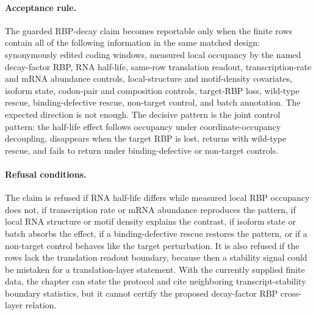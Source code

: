 \paragraph{Acceptance rule.}
The guarded RBP-decay claim becomes reportable only when the finite rows contain all of the following information in the same matched design: synonymously edited coding windows, measured local occupancy by the named decay-factor RBP, RNA half-life, same-row translation readout, transcription-rate and mRNA abundance controls, local-structure and motif-density covariates, isoform state, codon-pair and composition controls, target-RBP loss, wild-type rescue, binding-defective rescue, non-target control, and batch annotation.  The expected direction is not enough.  The decisive pattern is the joint control pattern: the half-life effect follows occupancy under coordinate-occupancy decoupling, disappears when the target RBP is lost, returns with wild-type rescue, and fails to return under binding-defective or non-target controls.

\paragraph{Refusal conditions.}
The claim is refused if RNA half-life differs while measured local RBP occupancy does not, if transcription rate or mRNA abundance reproduces the pattern, if local RNA structure or motif density explains the contrast, if isoform state or batch absorbs the effect, if a binding-defective rescue restores the pattern, or if a non-target control behaves like the target perturbation.  It is also refused if the rows lack the translation readout boundary, because then a stability signal could be mistaken for a translation-layer statement.  With the currently supplied finite data, the chapter can state the protocol and cite neighboring transcript-stability boundary statistics, but it cannot certify the proposed decay-factor RBP cross-layer relation.
